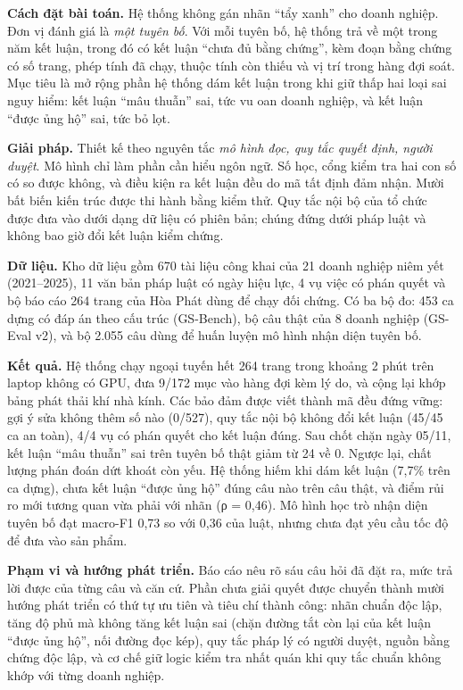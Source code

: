\documentclass[12pt,a4paper,oneside]{report}
\begin{document}
\textbf{Cách đặt bài toán.} Hệ thống không gán nhãn “tẩy xanh” cho doanh nghiệp. Đơn vị đánh giá là \emph{một tuyên bố}. Với mỗi tuyên bố, hệ thống trả về một trong năm kết luận, trong đó có kết luận “chưa đủ bằng chứng”, kèm đoạn bằng chứng có số trang, phép tính đã chạy, thuộc tính còn thiếu và vị trí trong hàng đợi soát. Mục tiêu là mở rộng phần hệ thống dám kết luận trong khi giữ thấp hai loại sai nguy hiểm: kết luận “mâu thuẫn” sai, tức vu oan doanh nghiệp, và kết luận “được ủng hộ” sai, tức bỏ lọt.

\textbf{Giải pháp.} Thiết kế theo nguyên tắc \emph{mô hình đọc, quy tắc quyết định, người duyệt}. Mô hình chỉ làm phần cần hiểu ngôn ngữ. Số học, cổng kiểm tra hai con số có so được không, và điều kiện ra kết luận đều do mã tất định đảm nhận. Mười bất biến kiến trúc được thi hành bằng kiểm thử. Quy tắc nội bộ của tổ chức được đưa vào dưới dạng dữ liệu có phiên bản; chúng đứng dưới pháp luật và không bao giờ đổi kết luận kiểm chứng.

\textbf{Dữ liệu.} Kho dữ liệu gồm 670 tài liệu công khai của 21 doanh nghiệp niêm yết (2021–2025), 11 văn bản pháp luật có ngày hiệu lực, 4 vụ việc có phán quyết và bộ báo cáo 264 trang của Hòa Phát dùng để chạy đối chứng. Có ba bộ đo: 453 ca dựng có đáp án theo cấu trúc (GS-Bench), bộ câu thật của 8 doanh nghiệp (GS-Eval v2), và bộ 2.055 câu dùng để huấn luyện mô hình nhận diện tuyên bố.

\textbf{Kết quả.} Hệ thống chạy ngoại tuyến hết 264 trang trong khoảng 2 phút trên laptop không có GPU, đưa 9/172 mục vào hàng đợi kèm lý do, và cộng lại khớp bảng phát thải khí nhà kính. Các bảo đảm được viết thành mã đều đứng vững: gợi ý sửa không thêm số nào (0/527), quy tắc nội bộ không đổi kết luận (45/45 ca an toàn), 4/4 vụ có phán quyết cho kết luận đúng. Sau chốt chặn ngày 05/11, kết luận “mâu thuẫn” sai trên tuyên bố thật giảm từ 24 về 0. Ngược lại, chất lượng phán đoán dứt khoát còn yếu. Hệ thống hiếm khi dám kết luận (7,7\% trên ca dựng), chưa kết luận “được ủng hộ” đúng câu nào trên câu thật, và điểm rủi ro mới tương quan vừa phải với nhãn (ρ = 0,46). Mô hình học trò nhận diện tuyên bố đạt macro-F1 0,73 so với 0,36 của luật, nhưng chưa đạt yêu cầu tốc độ để đưa vào sản phẩm.

\textbf{Phạm vi và hướng phát triển.} Báo cáo nêu rõ sáu câu hỏi đã đặt ra, mức trả lời được của từng câu và căn cứ. Phần chưa giải quyết được chuyển thành mười hướng phát triển có thứ tự ưu tiên và tiêu chí thành công: nhãn chuẩn độc lập, tăng độ phủ mà không tăng kết luận sai (chặn đường tắt còn lại của kết luận “được ủng hộ”, nối đường đọc kép), quy tắc pháp lý có người duyệt, nguồn bằng chứng độc lập, và cơ chế giữ logic kiểm tra nhất quán khi quy tắc chuẩn không khớp với từng doanh nghiệp.
\end{document}
